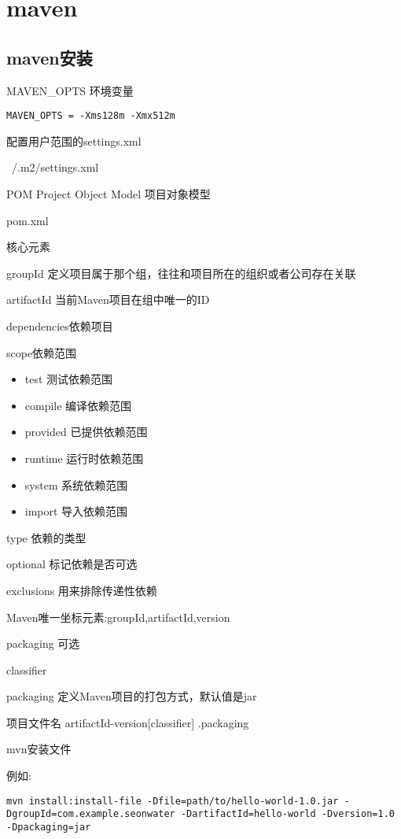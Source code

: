 \chapter{maven}
\label{chap:maven}

\section{maven安装}

MAVEN_OPTS 环境变量

\begin{lstlisting}[style=cshell]
MAVEN_OPTS = -Xms128m -Xmx512m
\end{lstlisting}

配置用户范围的settings.xml

~/.m2/settings.xml

POM Project Object Model 项目对象模型

pom.xml

核心元素

groupId 定义项目属于那个组，往往和项目所在的组织或者公司存在关联

artifactId 当前Maven项目在组中唯一的ID


dependencies依赖项目

scope依赖范围  

\begin{itemize}
    \item test    测试依赖范围
    \item compile 编译依赖范围
    \item provided 已提供依赖范围
    \item runtime 运行时依赖范围
    \item system 系统依赖范围
    \item import 导入依赖范围
\end{itemize}
    

    
    
    

    

    

    

    

    

type 依赖的类型

optional 标记依赖是否可选

exclusions 用来排除传递性依赖


Maven唯一坐标元素:groupId,artifactId,version

packaging 可选

classifier 


packaging 定义Maven项目的打包方式，默认值是jar

项目文件名 artifactId-version[classifier] .packaging


mvn安装文件

例如:

\begin{lstlisting}[style=cshell]
    mvn install:install-file -Dfile=path/to/hello-world-1.0.jar -DgroupId=com.example.seonwater -DartifactId=hello-world -Dversion=1.0 -Dpackaging=jar
\end{lstlisting}






